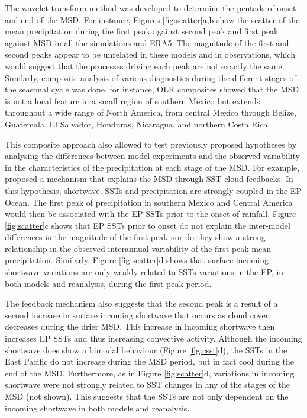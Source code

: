 The wavelet transform method was developed to determine the pentads of onset and end of the MSD.  For instance, Figures \ref{fig:scatter}a,b show the scatter of the mean precipitation during the first peak against second peak and first peak against MSD in all the simulations and ERA5. The magnitude of the first and second peaks appear to be unrelated in these models and in observations, which would suggest that the processes driving each peak are not exactly the same.
 Similarly, composite analysis of various diagnostics during the different stages of the seasonal cycle was done, for instance,  OLR composites showed that the MSD is not a local feature in a small region of southern Mexico but extends throughout a wide range of North America,  from central Mexico through Belize, Guatemala, El Salvador, Honduras, Nicaragua, and northern Costa Rica. %
 
 This composite approach also allowed to test previously proposed hypotheses by analysing the differences between model experiments and the observed variability in the characteristics of the precipitation at each stage of the MSD.
 For example, \cite{magana1999} proposed a mechanism that explains the MSD through SST-cloud feedbacks. In this hypothesis, shortwave, SSTs and precipitation are strongly coupled in the EP Ocean. The first peak of precipitation in southern Mexico and Central America would then be associated with the EP SSTs prior to the onset of rainfall. 
 Figure \ref{fig:scatter}c shows that EP SSTs prior to onset do not explain the inter-model differences in the magnitude of the first peak nor do they show a strong relationship in the observed interannual variability of the first peak mean precipitation. 
 Similarly, Figure \ref{fig:scatter}d shows that surface incoming shortwave variations are only weakly related to SSTs variations in the EP, in both models and reanalysis, during the first peak period. 
 
The feedback mechanism also suggests that the second peak is a result of a second increase in surface incoming shortwave that occurs as cloud cover decreases during the drier MSD. This increase in incoming shortwave then increases EP SSTs and thus increasing convective activity. Although the incoming shortwave does show a bimodal behaviour (Figure \ref{fig:csst}d), the SSTs in the East Pacific do not increase during the MSD period, but in fact cool during the end of the MSD.   Furthermore, as in Figure \ref{fig:scatter}d, variations in incoming shortwave were not strongly related to SST changes in any of the stages of the MSD (not shown). This suggests that the SSTs are not only dependent on the incoming shortwave in both models and reanalysis.

